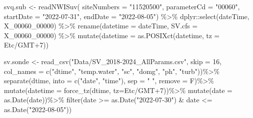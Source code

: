 \documentclass[
  letterpaper,
  DIV=11,
  numbers=noendperiod]{scrartcl}
\newenvironment{Shaded}{\begin{snugshade}}{\end{snugshade}}
\newcommand{\AttributeTok}[1]{\textcolor[rgb]{0.40,0.45,0.13}{#1}}
\newcommand{\DecValTok}[1]{\textcolor[rgb]{0.68,0.00,0.00}{#1}}
\newcommand{\FunctionTok}[1]{\textcolor[rgb]{0.28,0.35,0.67}{#1}}
\newcommand{\NormalTok}[1]{\textcolor[rgb]{0.00,0.23,0.31}{#1}}
\newcommand{\OtherTok}[1]{\textcolor[rgb]{0.00,0.23,0.31}{#1}}
\newcommand{\SpecialCharTok}[1]{\textcolor[rgb]{0.37,0.37,0.37}{#1}}
\newcommand{\StringTok}[1]{\textcolor[rgb]{0.13,0.47,0.30}{#1}}
\begin{document}
\small

\begin{Shaded}
\begin{Highlighting}[]
\NormalTok{svq.sub }\OtherTok{\textless{}{-}} \FunctionTok{readNWISuv}\NormalTok{(}
  \AttributeTok{siteNumbers =} \StringTok{"11520500"}\NormalTok{,}
  \AttributeTok{parameterCd =} \StringTok{"00060"}\NormalTok{,    }
  \AttributeTok{startDate =} \StringTok{"2022{-}07{-}31"}\NormalTok{,}
  \AttributeTok{endDate =} \StringTok{"2022{-}08{-}05"}\NormalTok{) }\SpecialCharTok{\%\textgreater{}\%}
\NormalTok{  dplyr}\SpecialCharTok{::}\FunctionTok{select}\NormalTok{(dateTime, X\_00060\_00000) }\SpecialCharTok{\%\textgreater{}\%} 
  \FunctionTok{rename}\NormalTok{(}\AttributeTok{datetime =}\NormalTok{ dateTime, }\AttributeTok{SV.cfs =}\NormalTok{ X\_00060\_00000) }\SpecialCharTok{\%\textgreater{}\%}
  \FunctionTok{mutate}\NormalTok{(}\AttributeTok{datetime =} \FunctionTok{as.POSIXct}\NormalTok{(datetime, }\AttributeTok{tz =} \StringTok{\textquotesingle{}Etc/GMT+7\textquotesingle{}}\NormalTok{))}

\NormalTok{sv.sonde }\OtherTok{\textless{}{-}} \FunctionTok{read\_csv}\NormalTok{(}\StringTok{"Data/SV\_2018{-}2024\_AllParams.csv"}\NormalTok{, }\AttributeTok{skip =} \DecValTok{16}\NormalTok{, }\AttributeTok{col\_names =} \FunctionTok{c}\NormalTok{(}\StringTok{"dtime"}\NormalTok{, }\StringTok{"temp.water"}\NormalTok{, }\StringTok{"sc"}\NormalTok{, }\StringTok{"domg"}\NormalTok{, }\StringTok{"ph"}\NormalTok{, }\StringTok{"turb"}\NormalTok{))}\SpecialCharTok{\%\textgreater{}\%}
            \FunctionTok{separate}\NormalTok{(dtime, }\AttributeTok{into =} \FunctionTok{c}\NormalTok{(}\StringTok{"date"}\NormalTok{, }\StringTok{"time"}\NormalTok{), }\AttributeTok{sep =} \StringTok{" "}\NormalTok{, }\AttributeTok{remove =}\NormalTok{ F)}\SpecialCharTok{\%\textgreater{}\%}
  \FunctionTok{mutate}\NormalTok{(}\AttributeTok{datetime =} \FunctionTok{force\_tz}\NormalTok{(dtime, }\AttributeTok{tz=}\StringTok{\textquotesingle{}Etc/GMT+7\textquotesingle{}}\NormalTok{))}\SpecialCharTok{\%\textgreater{}\%}
  \FunctionTok{mutate}\NormalTok{(}\AttributeTok{date =} \FunctionTok{as.Date}\NormalTok{(date))}\SpecialCharTok{\%\textgreater{}\%}
  \FunctionTok{filter}\NormalTok{(date }\SpecialCharTok{\textgreater{}=} \FunctionTok{as.Date}\NormalTok{(}\StringTok{"2022{-}07{-}30"}\NormalTok{) }\SpecialCharTok{\&}\NormalTok{ date }\SpecialCharTok{\textless{}=} \FunctionTok{as.Date}\NormalTok{(}\StringTok{"2022{-}08{-}05"}\NormalTok{))}


\end{Highlighting}
\end{Shaded}
\end{document}
